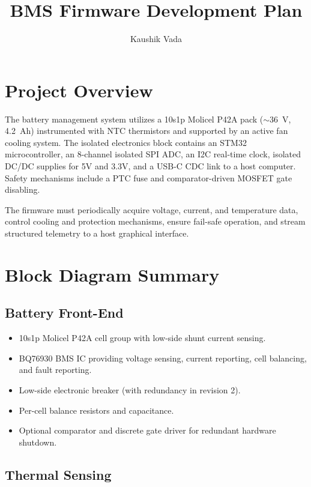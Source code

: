 \documentclass[12pt]{article}
\title{BMS Firmware Development Plan}
\author{Kaushik Vada}
\date{}
\begin{document}
\maketitle
\tableofcontents
\newpage

\section{Project Overview}

The battery management system utilizes a 10s1p Molicel P42A pack ($\sim$36~V, 4.2~Ah) instrumented with NTC thermistors and supported by an active fan cooling system. The isolated electronics block contains an STM32 microcontroller, an 8-channel isolated SPI ADC, an I2C real-time clock, isolated DC/DC supplies for 5V and 3.3V, and a USB-C CDC link to a host computer. Safety mechanisms include a PTC fuse and comparator-driven MOSFET gate disabling.

The firmware must periodically acquire voltage, current, and temperature data, control cooling and protection mechanisms, ensure fail-safe operation, and stream structured telemetry to a host graphical interface.

\section{Block Diagram Summary}

\subsection{Battery Front-End}

\begin{itemize}
\item 10s1p Molicel P42A cell group with low-side shunt current sensing.
\item BQ76930 BMS IC providing voltage sensing, current reporting, cell balancing, and fault reporting.
\item Low-side electronic breaker (with redundancy in revision 2).
\item Per-cell balance resistors and capacitance.
\item Optional comparator and discrete gate driver for redundant hardware shutdown.
\end{itemize}

\subsection{Thermal Sensing}
\end{document}
